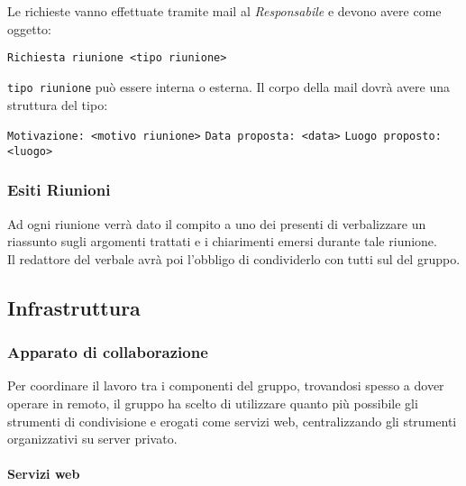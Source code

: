 \documentclass{scalatekids-article}
\begin{document}
\label{sec:RegoleRichiesta}
Le richieste vanno effettuate tramite mail al \textit{Responsabile} e devono avere come oggetto:
\begin{center}
    \verb=Richiesta riunione <tipo riunione>=
\end{center}
\verb=tipo riunione= può essere interna o esterna.
Il corpo della mail dovrà avere una struttura del tipo:
\begin{center}
    \verb=Motivazione: <motivo riunione>=
    \verb=Data proposta: <data>=
    \verb=Luogo proposto: <luogo>=
\end{center}

\subsubsection{Esiti Riunioni}

Ad ogni riunione verrà dato il compito a uno dei presenti di verbalizzare un riassunto sugli argomenti trattati e i chiarimenti emersi durante tale riunione.\\
Il redattore del verbale avrà poi l'obbligo di condividerlo con tutti sul  del gruppo.

\subsection{Infrastruttura}

\subsubsection{Apparato di collaborazione}

Per coordinare il lavoro tra i componenti del gruppo, trovandosi spesso a dover
operare in remoto, il gruppo ha scelto di utilizzare quanto più possibile gli
strumenti di condivisione e  erogati come servizi web,
centralizzando gli strumenti organizzativi su server privato.

\paragraph{Servizi web}
\end{document}
